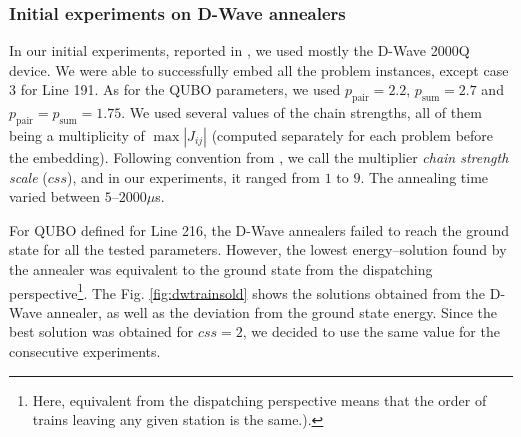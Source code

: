 \subsubsection{Initial experiments on D-Wave annealers}
In our initial experiments, reported in \cite{railwaydispatching}, we used
mostly the D-Wave 2000Q device. We were able to successfully embed all the
problem instances, except case 3 for Line 191. As for the QUBO parameters, we
used $p_{\text{pair}}=2.2$, $p_{\text{sum}}=2.7$ and
  $p_{\text{pair}}=p_{\text{sum}}=1.75$. We used several values of the chain
    strengths, all of them being a multiplicity of $\max|J_{ij}|$ (computed
separately for each problem before the embedding). Following convention from
\cite{railwaydispatching}, we call the multiplier \emph{chain strength scale}
($css$), and in our experiments, it ranged from $1$ to $9$. The annealing time
varied between $5$--$2000\mu$s.

For QUBO defined for Line 216, the D-Wave annealers failed to reach the ground
state for all the tested parameters. However, the lowest energy--solution found
by the annealer was equivalent to the ground state from the dispatching
perspective\footnote{Here, equivalent from the dispatching perspective means
  that the order of trains leaving any given station is the same.).}. The Fig.
\ref{fig:dwtrainsold} shows the solutions obtained from the D-Wave annealer, as
well as the deviation from the ground state energy. Since the best solution was
obtained for $css=2$, we decided to use the same value for the consecutive
experiments.

